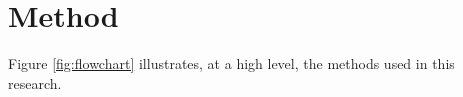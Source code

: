 \documentclass[12pt,a4paper]{article}
\begin{document}


\newpage
\section{Method}
\label{sec:method}

Figure \ref{fig:flowchart} illustrates, at a high level, the methods used in this research.
\end{document}
